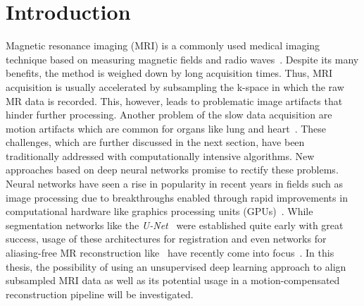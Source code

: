 
\chapter{Introduction} \label{Ch:Introduction}
Magnetic resonance imaging (MRI) is a commonly used medical imaging technique based on measuring magnetic fields and radio waves~\cite{Brown2014,Serai2021,Singh2023}. Despite its many benefits, the method is weighed down by long acquisition times.
Thus, MRI acquisition is usually accelerated by subsampling the k-space in which the raw MR data is recorded. This, however, leads to problematic image artifacts that hinder further processing. Another problem of the slow data acquisition are motion artifacts which are common for organs like lung and heart~\cite{Chen2022}. These challenges, which are further discussed in the next section, have been traditionally addressed with computationally intensive algorithms. New approaches based on deep neural networks promise to rectify these problems. Neural networks have seen a rise in popularity in recent years in fields such as image processing due to breakthroughs enabled through rapid improvements in computational hardware like graphics processing units (GPUs)~\cite{Chen2020}. While segmentation networks like the \emph{U-Net}~\cite{U-Net} were established quite early with great success, usage of these architectures for registration and even networks for aliasing-free MR reconstruction like~\cite{Kuestner2022,Ghoul2024,Pan2024} have recently come into focus~\cite{Chen2020,Haskins2020}. In this thesis, the possibility of using an unsupervised deep learning approach to align subsampled MRI data as well as its potential usage in a motion-compensated reconstruction pipeline will be investigated.


